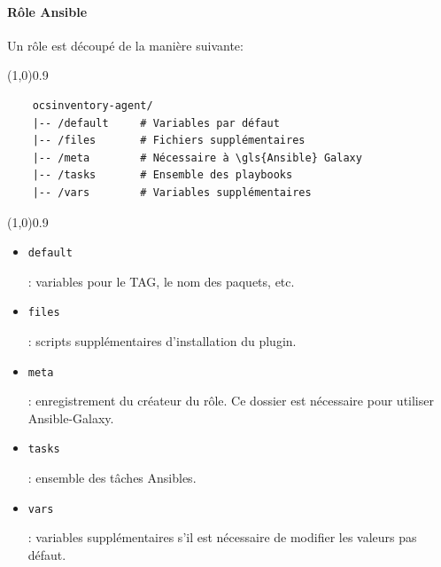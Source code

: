 \documentclass[12pt]{article}
\begin{document}
\paragraph{Rôle \gls{Ansible}}
Un rôle est découpé de la manière suivante:
\vspace{-1ex}
\begin{code}
\vspace{-1ex}
\begin{center} 
    \line(1,0){0.9\textwidth} 
\end{center}
\vspace{-1ex}
\begin{verbatim}
    ocsinventory-agent/
    |-- /default     # Variables par défaut
    |-- /files       # Fichiers supplémentaires
    |-- /meta        # Nécessaire à \gls{Ansible} Galaxy
    |-- /tasks       # Ensemble des playbooks
    |-- /vars        # Variables supplémentaires
\end{verbatim}
\vspace{-1ex}
\begin{center} 
    \line(1,0){0.9\textwidth} 
\end{center}
\vspace{-1ex}
\end{code}

\begin{itemize}
    \item \begin{code}\texttt{default}\end{code}: variables pour le TAG, le nom des paquets, etc.
    \item \begin{code}\texttt{files}\end{code}: scripts supplémentaires d'installation du plugin.
    \item \begin{code}\texttt{meta}\end{code}: enregistrement du créateur du rôle. Ce dossier est nécessaire pour utiliser \gls{Ansible}-Galaxy.
    \item \begin{code}\texttt{tasks}\end{code}: ensemble des tâches Ansibles.
    \item \begin{code}\texttt{vars}\end{code}: variables supplémentaires s'il est nécessaire de modifier les valeurs pas défaut.
\end{itemize}
\end{document}
